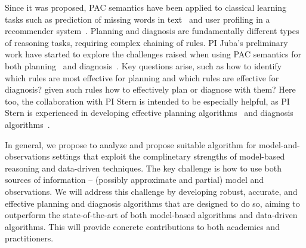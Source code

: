 Since it was proposed, PAC semantics have been applied to classical learning tasks such as prediction of missing words in text~\cite{michael2008first} and user profiling in a recommender system~\cite{semeraro2009knowledge}. Planning and diagnosis are fundamentally different types of reasoning tasks, requiring complex chaining of rules. PI Juba's preliminary work have started to explore the challenges raised when using PAC semantics for both planning~\cite{juba2016jmlr} and diagnosis~\cite{juba2016aaai}. Key questions arise, such as how to identify which rules are most effective for planning and which rules are effective for diagnosis? given such rules how to effectively plan or diagnose with them? 
Here too, the collaboration with PI Stern is intended to be especially helpful, as PI Stern is experienced in developing effective planning algorithms~\cite{stern2010usingLookahead,stern2014potential,gilon2016dynamic,sharon2013increasing,sharon2015conflict,gilon2016dynamic} and diagnosis algorithms~\cite{stern2012exploring,metodi2014novel,lazebnik2016solving,elmishali2016dataAugmented}.



In general, we propose to analyze and propose suitable algorithm for model-and-observations settings 
that exploit the complinetary strengths of model-based reasoning and data-driven techniques. The key challenge is how to use both sources of information -- (possibly approximate and partial) model and observations. We will address this challenge by developing robust, accurate, and effective planning and diagnosis algorithms that are designed to do so, aiming to outperform the state-of-the-art of both model-based algorithms and data-driven algorithms. This will provide concrete contributions to both academics and practitioners. 

